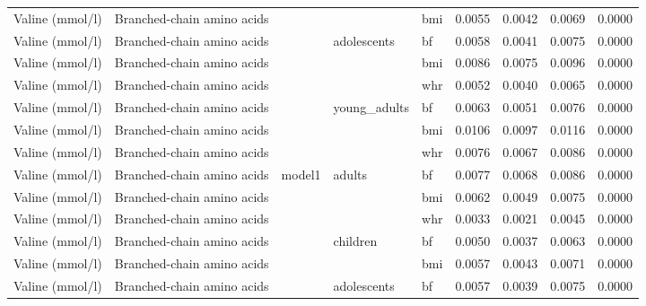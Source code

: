 \documentclass[11pt,twoside]{bristolthesis}
\begin{document}
\begin{longtable}[t]{lllllrrrr}
\cmidrule{1-2}
\cmidrule{4-9}\nopagebreak
Valine (mmol/l) & Branched-chain amino acids &  &  & bmi & 0.0055 & 0.0042 & 0.0069 & 0.0000\\
\cmidrule{1-2}
\cmidrule{5-9}\nopagebreak
Valine (mmol/l) & Branched-chain amino acids &  & \multirow{-2}{*}{\raggedright\arraybackslash adolescents} & bf & 0.0058 & 0.0041 & 0.0075 & 0.0000\\
\cmidrule{1-2}
\cmidrule{4-9}\nopagebreak
Valine (mmol/l) & Branched-chain amino acids &  &  & bmi & 0.0086 & 0.0075 & 0.0096 & 0.0000\\
\cmidrule{1-2}
\cmidrule{5-9}\nopagebreak
Valine (mmol/l) & Branched-chain amino acids &  &  & whr & 0.0052 & 0.0040 & 0.0065 & 0.0000\\
\cmidrule{1-2}
\cmidrule{5-9}\nopagebreak
Valine (mmol/l) & Branched-chain amino acids &  & \multirow{-3}{*}{\raggedright\arraybackslash young\_adults} & bf & 0.0063 & 0.0051 & 0.0076 & 0.0000\\
\cmidrule{1-2}
\cmidrule{4-9}\nopagebreak
Valine (mmol/l) & Branched-chain amino acids &  &  & bmi & 0.0106 & 0.0097 & 0.0116 & 0.0000\\
\cmidrule{1-2}
\cmidrule{5-9}\nopagebreak
Valine (mmol/l) & Branched-chain amino acids &  &  & whr & 0.0076 & 0.0067 & 0.0086 & 0.0000\\
\cmidrule{1-2}
\cmidrule{5-9}\nopagebreak
Valine (mmol/l) & Branched-chain amino acids & \multirow{-11}{*}{\raggedright\arraybackslash model1} & \multirow{-3}{*}{\raggedright\arraybackslash adults} & bf & 0.0077 & 0.0068 & 0.0086 & 0.0000\\
\cmidrule{1-9}\pagebreak[0]
Valine (mmol/l) & Branched-chain amino acids &  &  & bmi & 0.0062 & 0.0049 & 0.0075 & 0.0000\\
\cmidrule{1-2}
\cmidrule{5-9}\nopagebreak
Valine (mmol/l) & Branched-chain amino acids &  &  & whr & 0.0033 & 0.0021 & 0.0045 & 0.0000\\
\cmidrule{1-2}
\cmidrule{5-9}\nopagebreak
Valine (mmol/l) & Branched-chain amino acids &  & \multirow{-3}{*}{\raggedright\arraybackslash children} & bf & 0.0050 & 0.0037 & 0.0063 & 0.0000\\
\cmidrule{1-2}
\cmidrule{4-9}\nopagebreak
Valine (mmol/l) & Branched-chain amino acids &  &  & bmi & 0.0057 & 0.0043 & 0.0071 & 0.0000\\
\cmidrule{1-2}
\cmidrule{5-9}\nopagebreak
Valine (mmol/l) & Branched-chain amino acids &  & \multirow{-2}{*}{\raggedright\arraybackslash adolescents} & bf & 0.0057 & 0.0039 & 0.0075 & 0.0000\\

\end{longtable}
\end{document}
